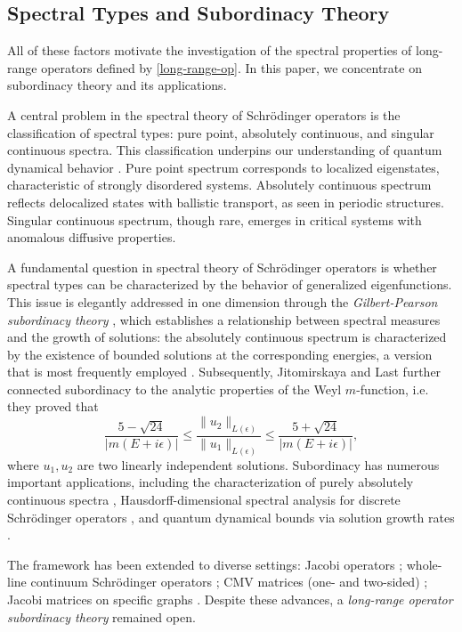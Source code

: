 \documentclass[11pt]{amsart}
\theoremstyle{remark}
\theoremstyle{definition}
\begin{document}
\subsection{Spectral Types and Subordinacy Theory}
All of these factors motivate the investigation of the spectral properties of long-range operators defined by \eqref{long-range-op}. In this paper, we concentrate on subordinacy theory and its applications.

A central problem in the spectral theory of Schr\"odinger operators is the classification of spectral types: pure point, absolutely continuous, and singular continuous spectra. This classification underpins our understanding of quantum dynamical behavior \cite{DF}. Pure point spectrum corresponds to localized eigenstates, characteristic of strongly disordered systems. Absolutely continuous spectrum reflects delocalized states with ballistic transport, as seen in periodic structures. Singular continuous spectrum, though rare, emerges in critical systems with anomalous diffusive properties.

A fundamental question in spectral theory of Schr\"odinger operators is whether spectral types can be characterized by the behavior of generalized eigenfunctions. This issue is elegantly addressed in one dimension through the \emph{Gilbert-Pearson subordinacy theory} \cite{GP}, which establishes a relationship between spectral measures and the growth of solutions: the absolutely continuous spectrum is characterized by the existence of bounded solutions at the corresponding energies, a version that is most frequently employed \cite{Simon}. Subsequently, Jitomirskaya and Last \cite{JL1,JL2} further connected subordinacy to the analytic properties of the Weyl $m$-function, i.e. they proved that 
$$ \frac{5-\sqrt{24}}{|m(E+i \epsilon)|}  \leq \frac{\|u_2\|_{L(\epsilon)}}{\|u_1\|_{L(\epsilon)}} \leq \frac{5+\sqrt{24}}{|m(E+i \epsilon)|},$$
where $u_1,u_2$ are two linearly independent solutions.
Subordinacy has numerous important applications, including the characterization of purely absolutely continuous spectra \cite{Avila: ac,WXYZZ}, Hausdorff-dimensional spectral analysis for discrete Schrödinger operators \cite{DKL,Z}, and quantum dynamical bounds via solution growth rates \cite{DT1,KKL}.

The framework has been extended to diverse settings: Jacobi operators \cite{KL}; whole-line continuum Schr\"odinger operators \cite{G}; CMV matrices (one- and two-sided) \cite{GDO,SO}; Jacobi matrices on specific graphs \cite{Le}.
Despite these advances, a \emph{long-range operator subordinacy theory} remained open. 
\end{document}
